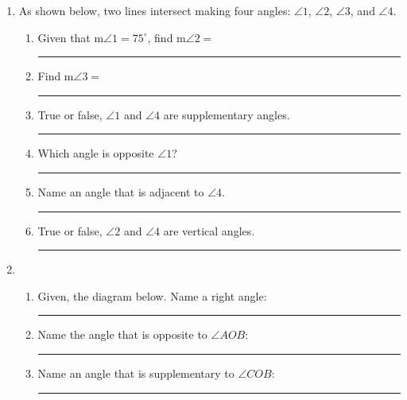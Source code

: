 \begin{enumerate}
\item As shown below, two lines intersect making four angles: $\angle 1$, $\angle 2$, $\angle 3$, and $\angle 4$.
  \begin{center}
  \end{center}
  \begin{enumerate}
    \item Given that m$\angle 1= 75^\circ$, find m$\angle 2=$ \rule{2.5cm}{0.15mm}
    \item Find m$\angle 3=$ \rule{2.5cm}{0.15mm}
    \item True or false, $\angle 1$ and $\angle 4$ are supplementary angles. \rule{3cm}{0.15mm}
    \item Which angle is opposite $\angle 1$? \rule{4cm}{0.15mm}
    \item Name an angle that is adjacent to $\angle 4$. \rule{4cm}{0.15mm}
    \item True or false, $\angle 2$ and $\angle 4$ are vertical angles. \rule{3cm}{0.15mm}
  \end{enumerate}

\newpage
\item 
  \begin{enumerate}
    \item Given, the diagram below. Name a right angle:  \rule{4cm}{0.15mm}  \bigskip
    \item Name the angle that is opposite to $\angle AOB$: \rule{4cm}{0.15mm}  \bigskip
    \item Name an angle that is supplementary to $\angle COB$: \rule{4cm}{0.15mm}
  \end{enumerate}
  \begin{center}
  \end{center}


\end{enumerate}
